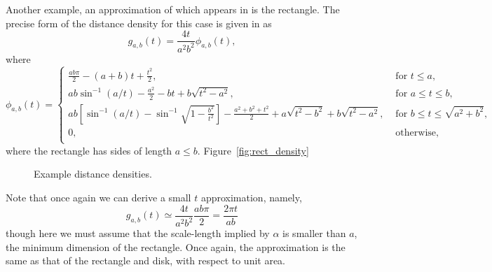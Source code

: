 \documentclass{article}
\begin{document}
Another example, an approximation of which appears in
\cite{m.naldi05:_connec_of_waxman_graph} is the rectangle. The precise
form of the distance density for this case is given in \cite[Theorem
2.4.4]{mathai_geom} as
\begin{equation}
  g_{a,b}(t) = \frac{4 t}{a^2 b^2} \phi_{a,b}(t),
  \label{eqn:rectangle}   
\end{equation}
where
\begin{equation}
  \phi_{a,b}(t) = \left\{
    \begin{array}{ll}
      \frac{ab \pi}{2} - (a+b) t + \frac{t^2}{2}, 
         & \mbox{ for } t \leq a, \\
      a b \sin^{-1} (a/t) - \frac{a^2}{2} - b t + b\sqrt{t^2 - a^2},
         & \mbox{ for } a \leq t \leq b, \\
      a b \left[ \sin^{-1} (a/t) - \sin^{-1} \sqrt{1 - \frac{b^2}{t^2}} \right]
        - \frac{a^2 + b^2 + t^2}{2} 
        + a\sqrt{t^2 - b^2}+ b\sqrt{t^2 - a^2},
         & \mbox{ for } b \leq t \leq \sqrt{a^2 + b^2}, \\
      0,
         & \mbox{ otherwise}, \\
    \end{array} \right. 
\end{equation}
where the rectangle has sides of length $a \leq b$. Figure~\ref{fig:rect_density}


\begin{figure}[tbp]
  \begin{center}
    \caption{Example distance densities.}
  \end{center} 
\vspace{-4mm}
\end{figure}



Note that once again we can derive a small $t$ approximation,
namely, 
\[ g_{a,b}(t) \simeq \frac{4 t}{a^2 b^2} \frac{ab \pi}{2}
            = \frac{2 \pi t}{a b} \]
though here we must assume that the scale-length implied by $\alpha$
is smaller than $a$, the minimum dimension of the rectangle.  Once
again, the approximation is the same as that of the rectangle and
disk, with respect to unit area.
\end{document}
